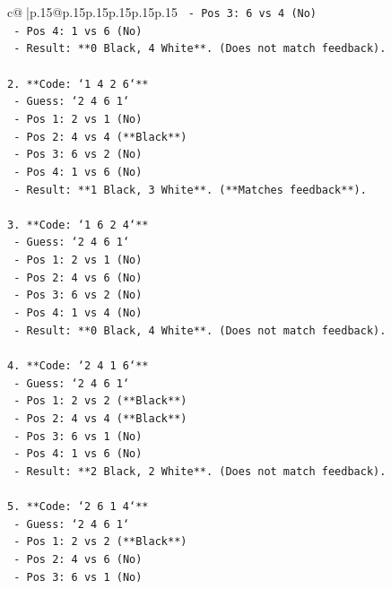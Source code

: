 \documentclass{article}
\begin{document}
{\begin{supertabular}{c@{$\;$}|p{.15\linewidth}@{}p{.15\linewidth}p{.15\linewidth}p{.15\linewidth}p{.15\linewidth}p{.15\linewidth}}
{{{\texttt{    {-} Pos 3: 6 vs 4 (No)} \\
\texttt{    {-} Pos 4: 1 vs 6 (No)} \\
\texttt{    {-} Result: **0 Black, 4 White**. (Does not match feedback).} \\
\\ 
\texttt{2.  **Code: `1 4 2 6`**} \\
\texttt{    {-} Guess: `2 4 6 1`} \\
\texttt{    {-} Pos 1: 2 vs 1 (No)} \\
\texttt{    {-} Pos 2: 4 vs 4 (**Black**)} \\
\texttt{    {-} Pos 3: 6 vs 2 (No)} \\
\texttt{    {-} Pos 4: 1 vs 6 (No)} \\
\texttt{    {-} Result: **1 Black, 3 White**. (**Matches feedback**).} \\
\\ 
\texttt{3.  **Code: `1 6 2 4`**} \\
\texttt{    {-} Guess: `2 4 6 1`} \\
\texttt{    {-} Pos 1: 2 vs 1 (No)} \\
\texttt{    {-} Pos 2: 4 vs 6 (No)} \\
\texttt{    {-} Pos 3: 6 vs 2 (No)} \\
\texttt{    {-} Pos 4: 1 vs 4 (No)} \\
\texttt{    {-} Result: **0 Black, 4 White**. (Does not match feedback).} \\
\\ 
\texttt{4.  **Code: `2 4 1 6`**} \\
\texttt{    {-} Guess: `2 4 6 1`} \\
\texttt{    {-} Pos 1: 2 vs 2 (**Black**)} \\
\texttt{    {-} Pos 2: 4 vs 4 (**Black**)} \\
\texttt{    {-} Pos 3: 6 vs 1 (No)} \\
\texttt{    {-} Pos 4: 1 vs 6 (No)} \\
\texttt{    {-} Result: **2 Black, 2 White**. (Does not match feedback).} \\
\\ 
\texttt{5.  **Code: `2 6 1 4`**} \\
\texttt{    {-} Guess: `2 4 6 1`} \\
\texttt{    {-} Pos 1: 2 vs 2 (**Black**)} \\
\texttt{    {-} Pos 2: 4 vs 6 (No)} \\
\texttt{    {-} Pos 3: 6 vs 1 (No)} \\
}}}
\end{supertabular}}
\end{document}
